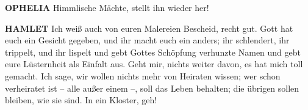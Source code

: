 \documentclass[11pt,a4paper]{scrreprt}
\begin{document}
\textbf{OPHELIA}
Himmlische Mächte, stellt ihn wieder her!

\textbf{HAMLET}
Ich weiß auch von euren Malereien Bescheid, recht gut. Gott hat euch ein
Gesicht gegeben, und ihr macht euch ein anders; ihr schlendert, ihr trippelt,
und ihr lispelt und gebt Gottes Schöpfung verhunzte Namen und gebt eure
Lüsternheit als Einfalt aus. Geht mir, nichts weiter davon, es hat mich toll
gemacht. Ich sage, wir wollen nichts mehr von Heiraten wissen; wer schon
verheiratet ist -- alle außer einem --, soll das Leben behalten; die übrigen
sollen bleiben, wie sie sind. In ein Kloster, geh!

\end{document}
